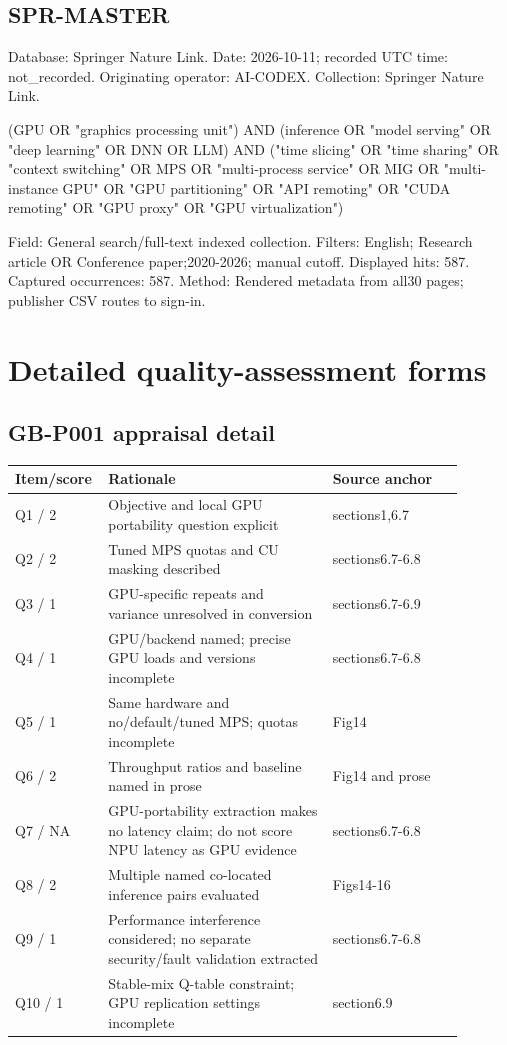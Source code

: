 \documentclass[12pt,a4paper]{article}
\begin{document}
\subsection{SPR-MASTER}
Database: Springer Nature Link. Date: 2026-10-11; recorded UTC time: not\_recorded. Originating operator: AI-CODEX. Collection: Springer Nature Link.


{\small\ttfamily\raggedright (GPU OR "graphics processing unit") AND (inference OR "model serving" OR "deep learning" OR DNN OR LLM) AND ("time slicing" OR "time sharing" OR "context switching" OR MPS OR "multi-process service" OR MIG OR "multi-instance GPU" OR "GPU partitioning" OR "API remoting" OR "CUDA remoting" OR "GPU proxy" OR "GPU virtualization")\par}
Field: General search/\allowbreak{}full-text indexed collection. Filters: English; Research article OR Conference paper;2020-2026; manual cutoff. Displayed hits: 587. Captured occurrences: 587. Method: Rendered metadata from all30 pages; publisher CSV routes to sign-in.



\clearpage\section{Detailed quality-assessment forms}
\subsection{GB-P001 appraisal detail}
\begin{longtable}{p{0.13\linewidth}p{0.48\linewidth}p{0.28\linewidth}}
\toprule
Item/\allowbreak{}score & Rationale & Source anchor\\\midrule
\endhead
Q1 /\allowbreak{} 2 & Objective and local GPU portability question explicit & sections1,6.7\\
Q2 /\allowbreak{} 2 & Tuned MPS quotas and CU masking described & sections6.7-6.8\\
Q3 /\allowbreak{} 1 & GPU-specific repeats and variance unresolved in conversion & sections6.7-6.9\\
Q4 /\allowbreak{} 1 & GPU/\allowbreak{}backend named; precise GPU loads and versions incomplete & sections6.7-6.8\\
Q5 /\allowbreak{} 1 & Same hardware and no/\allowbreak{}default/\allowbreak{}tuned MPS; quotas incomplete & Fig14\\
Q6 /\allowbreak{} 2 & Throughput ratios and baseline named in prose & Fig14 and prose\\
Q7 /\allowbreak{} NA & GPU-portability extraction makes no latency claim; do not score NPU latency as GPU evidence & sections6.7-6.8\\
Q8 /\allowbreak{} 2 & Multiple named co-located inference pairs evaluated & Figs14-16\\
Q9 /\allowbreak{} 1 & Performance interference considered; no separate security/\allowbreak{}fault validation extracted & sections6.7-6.8\\
Q10 /\allowbreak{} 1 & Stable-mix Q-table constraint; GPU replication settings incomplete & section6.9\\
\bottomrule
\end{longtable}
\end{document}
